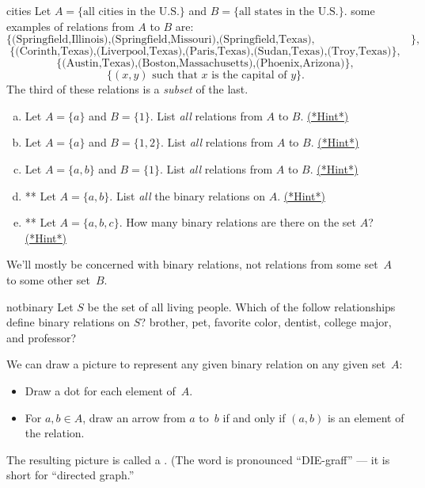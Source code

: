 \begin{example}{cities}
Let $A = \{\text{all cities in the U.S.}\}$ and $B = \{\text{all states in the U.S.}\}$. some examples of relations from $A$ to $B$ are:
\[ \{ \text{(Springfield,Illinois),(Springfield,Missouri),(Springfield,Texas),(Springfield,Wisconsin)}\}, \]
\[ \{ \text{(Corinth,Texas),(Liverpool,Texas),(Paris,Texas),(Sudan,Texas),(Troy,Texas)}\}, \]
\[ \{ \text{(Austin,Texas),(Boston,Massachusetts),(Phoenix,Arizona)}\}, \]
\[ \{ (x,y) \text{ such that } x \text{ is the capital of } y \}. \]
The third of these relations is a \emph{subset} of the last.
\end{example}


\begin{exercise}{7}
\begin{enumerate}[(a)]
\item
Let $A = \{a\}$ and $B = \{1\}$. List \emph{all} relations from $A$ to $B$.
\hyperref[secEqRelChapHints]{(*Hint*)}
\item
Let $A = \{a\}$ and $B = \{1,2\}$. List \emph{all} relations from $A$ to $B$.
\hyperref[secEqRelChapHints]{(*Hint*)}
\item
Let $A = \{a,b\}$ and $B = \{1\}$. List \emph{all} relations from $A$ to $B$.
\hyperref[secEqRelChapHints]{(*Hint*)}
\item
** Let $A = \{a,b\}$. List \emph{all} the binary relations on $A$.
\hyperref[secEqRelChapHints]{(*Hint*)}
\item
** Let $A = \{a,b,c\}$. How many binary relations are there on the set $A$?
\hyperref[secEqRelChapHints]{(*Hint*)}
\end{enumerate}
\end{exercise}

We'll mostly be concerned with binary relations, not relations from some set~$A$ to some other set~$B$.

\begin{exercise}{notbinary}
Let $S$ be the set of all living people. Which of the follow relationships define binary relations on $S$?
brother, pet, favorite color, dentist, college major, and professor?
 \end{exercise}

\begin{defn} \label{digraph} 
We can draw a picture to represent any given binary relation on any given set~$A$:
	\begin{itemize}
	\item Draw a dot for each element of~$A$.
	\item For $a,b \in A$, draw an arrow from $a$ to~$b$ if and only if $(a,b)$ is an element of the relation.
	\end{itemize} 
The resulting picture is called a . (The word is pronounced ``DIE-graff'' --- it is short for ``directed graph.''
\end{defn}
 
